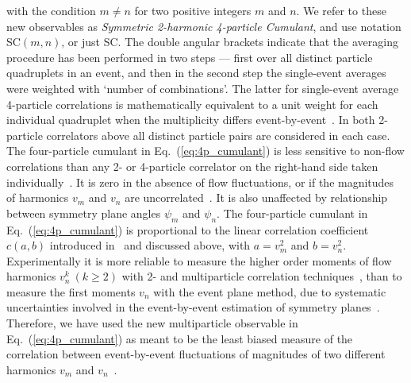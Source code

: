 with the condition $m\neq n$ for two positive integers $m$ and $n$. We refer to these new observables as {\it Symmetric 2-harmonic 4-particle Cumulant}, and use notation SC$(m,n)$, or just SC. The double angular brackets indicate that the averaging procedure has been performed in two steps --- first over all distinct particle quadruplets in an event, and then in the second step the single-event averages were weighted with `number of combinations'. The latter for single-event average 4-particle correlations is mathematically equivalent to a unit weight for each individual quadruplet when the multiplicity differs event-by-event~\cite{Bilandzic:2012wva}. In both 2-particle correlators above all distinct particle pairs are considered in each case. The four-particle cumulant in Eq.~(\ref{eq:4p_cumulant}) is less sensitive to non-flow correlations than any 2- or 4-particle correlator on the right-hand side taken individually~\cite{Borghini:2001vi}. It is zero in the absence of flow fluctuations, or if the magnitudes of harmonics $v_m$ and $v_n$ are uncorrelated~\cite{Bilandzic:2013kga}. It is also unaffected by relationship between symmetry plane angles $\psi_m$ and $\psi_n$. The four-particle cumulant in Eq.~(\ref{eq:4p_cumulant}) is proportional to the linear correlation coefficient $c(a,b)$ introduced in~\cite{Niemi:2012aj} and discussed above, with $a=v_m^2$ and $b=v_n^2$. Experimentally it is more reliable to measure the higher order moments of flow harmonics $v_n^k\ (k \ge 2)$ with 2- and multiparticle correlation techniques~\cite{Borghini:2001vi,Bilandzic:2010jr,PhysRevC.44.1091}, than to measure the first moments $v_n$ with the event plane method, due to systematic uncertainties involved in the event-by-event estimation of symmetry planes~\cite{Poskanzer:1998yz,Luzum:2012da}. Therefore, we have used the new multiparticle observable in Eq.~(\ref{eq:4p_cumulant}) as meant to be the least biased measure of the correlation between event-by-event fluctuations of magnitudes of two different harmonics $v_m$ and $v_n$~\cite{Bilandzic:2013kga}.

